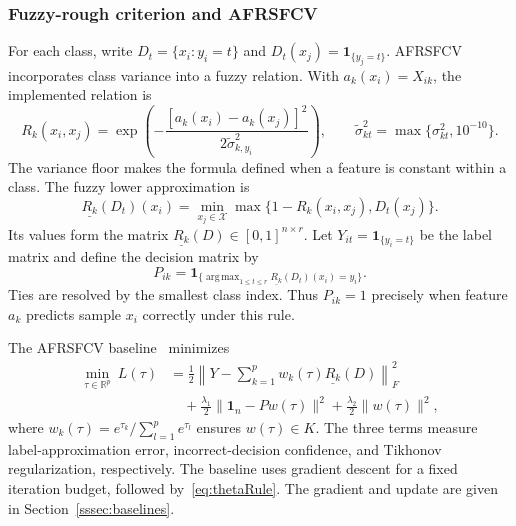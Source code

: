 \documentclass[]{interact}
\theoremstyle{plain}
\theoremstyle{definition}
\theoremstyle{remark}
\newcommand{\R}{\mathbb{R}}
\DeclareMathOperator*{\argmax}{arg\,max}
\begin{document}
\subsubsection{Fuzzy-rough criterion and AFRSFCV}\label{ssec:afrsfcv}\label{sssec:afrsfcv-inputs}\label{sssec:afrsfcv-model}
For each class, write $D_t=\{x_i:y_i=t\}$ and $D_t(x_j)=\mathbf1_{\{y_j=t\}}$. AFRSFCV incorporates class variance into a fuzzy relation. With $a_k(x_i)=X_{ik}$, the implemented relation is
\begin{equation}\label{eq:simRel}
R_k(x_i,x_j)=\exp\!\left(-\frac{[a_k(x_i)-a_k(x_j)]^2}{2\widetilde\sigma_{k,y_i}^2}\right),
\qquad \widetilde\sigma_{kt}^2=\max\{\sigma_{kt}^2,10^{-10}\}.
\end{equation}
The variance floor makes the formula defined when a feature is constant within a class. The fuzzy lower approximation is
\begin{equation}\label{eq:lower}
\underline{R_k}(D_t)(x_i)=\min_{x_j\in\mathcal{X}}\max\{1-R_k(x_i,x_j),D_t(x_j)\}.
\end{equation}
Its values form the matrix $\underline{R_k}(D)\in[0,1]^{n\times r}$. Let $Y_{it}=\mathbf1_{\{y_i=t\}}$ be the label matrix and define the decision matrix by
\begin{equation}\label{eq:Pmat}
P_{ik}=\mathbf1_{\{\argmax_{1\le t\le r}\underline{R_k}(D_t)(x_i)=y_i\}}.
\end{equation}
Ties are resolved by the smallest class index. Thus $P_{ik}=1$ precisely when feature $a_k$ predicts sample $x_i$ correctly under this rule.

The AFRSFCV baseline~\citep{wang2026afrsfcv} minimizes
\begin{equation}\label{eq:afrsfcvLoss}
\begin{split}
\min_{\tau\in\R^p}\ L(\tau)
&=\frac12\left\|Y-\sum_{k=1}^{p}w_k(\tau)\underline{R_k}(D)\right\|_F^2\\
&\quad+\frac{\lambda_1}{2}\|\mathbf1_n-Pw(\tau)\|^2+\frac{\lambda_2}{2}\|w(\tau)\|^2,
\end{split}
\end{equation}
where $w_k(\tau)=e^{\tau_k}/\sum_{l=1}^{p}e^{\tau_l}$ ensures $w(\tau)\in K$. The three terms measure label-approximation error, incorrect-decision confidence, and Tikhonov regularization, respectively. The baseline uses gradient descent for a fixed iteration budget, followed by~\eqref{eq:thetaRule}. The gradient and update are given in Section~\ref{sssec:baselines}.
\end{document}
